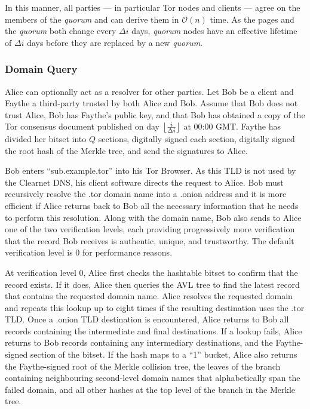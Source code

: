 In this manner, all parties --- in particular Tor nodes and clients --- agree on the members of the \emph{quorum} and can derive them in $ \mathcal{O}(n) $ time. As the pages and the \emph{quorum} both change every $ \Delta i $ days, \emph{quorum} nodes have an effective lifetime of $ \Delta i $ days before they are replaced by a new \emph{quorum}.

\subsubsection{Domain Query}
\label{sec:DomainQuery}


Alice can optionally act as a resolver for other parties. Let Bob be a client and Faythe a third-party trusted by both Alice and Bob. Assume that Bob does not trust Alice, Bob has Faythe's public key, and that Bob has obtained a copy of the Tor consensus document published on day $ \floor[\big]{\frac{i}{\Delta i}} $ at 00:00 GMT. Faythe has divided her bitset into $ Q $ sections, digitally signed each section, digitally signed the root hash of the Merkle tree, and send the signatures to Alice.

Bob enters ``sub.example.tor'' into his Tor Browser. As this TLD is not used by the Clearnet DNS, his client software directs the request to Alice. Bob must recursively resolve the .tor domain name into a .onion address and it is more efficient if Alice returns back to Bob all the necessary information that he needs to perform this resolution. Along with the domain name, Bob also sends to Alice one of the two verification levels, each providing progressively more verification that the record Bob receives is authentic, unique, and trustworthy. The default verification level is 0 for performance reasons.

At verification level 0, Alice first checks the hashtable bitset to confirm that the record exists. If it does, Alice then queries the AVL tree to find the latest record that contains the requested domain name. Alice resolves the requested domain and repeats this lookup up to eight times if the resulting destination uses the .tor TLD. Once a .onion TLD destination is encountered, Alice returns to Bob all records containing the intermediate and final destinations. If a lookup fails, Alice returns to Bob records containing any intermediary destinations, and the Faythe-signed section of the bitset. If the hash maps to a ``1'' bucket, Alice also returns the Faythe-signed root of the Merkle collision tree, the leaves of the branch containing neighbouring second-level domain names that alphabetically span the failed domain, and all other hashes at the top level of the branch in the Merkle tree.

